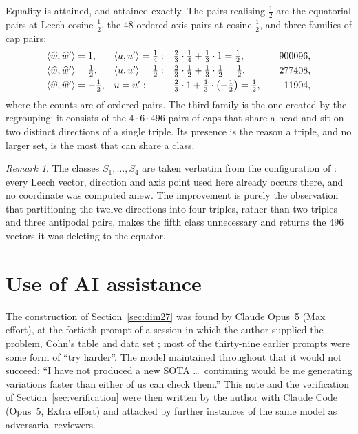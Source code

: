 \documentclass[11pt]{amsart}
\theoremstyle{remark}
\newtheorem{remark}[theorem]{Remark}
\newcommand{\ip}[2]{\langle #1,#2\rangle}
\newcommand{\wh}{\widehat{w}}
\begin{document}
Equality is attained, and attained exactly. The pairs realising $\tfrac12$ are
the equatorial pairs at Leech cosine $\tfrac12$, the $48$ ordered axis pairs at
cosine $\tfrac12$, and three families of cap pairs:
\[
\begin{array}{lll@{\qquad}r}
   \ip{\wh}{\wh{}'}=1,        &\ip{u}{u'}=\tfrac14:
      &\tfrac23\cdot\tfrac14+\tfrac13\cdot1=\tfrac12,
      &900096,\\[3pt]
   \ip{\wh}{\wh{}'}=\tfrac12, &\ip{u}{u'}=\tfrac12:
      &\tfrac23\cdot\tfrac12+\tfrac13\cdot\tfrac12=\tfrac12,
      &277408,\\[3pt]
   \ip{\wh}{\wh{}'}=-\tfrac12,&u=u':
      &\tfrac23\cdot1+\tfrac13\cdot\bigl(-\tfrac12\bigr)=\tfrac12,
      &11904,
\end{array}
\]
where the counts are of ordered pairs. The third family is the one created by
the regrouping: it consists of the $4\cdot6\cdot496$ pairs of caps that share a
head and sit on two distinct directions of a single triple. Its presence is the
reason a triple, and no larger set, is the most that can share a class.

\begin{remark}
The classes $S_1,\dots,S_4$ are taken verbatim from the configuration of
\cite{ma2025}: every Leech vector, direction and axis point used here already
occurs there, and no coordinate was computed anew. The improvement is purely the
observation that partitioning the twelve directions into four triples, rather
than two triples and three antipodal pairs, makes the fifth class unnecessary
and returns the $496$ vectors it was deleting to the equator.
\end{remark}

\section*{Use of AI assistance}

The construction of Section~\ref{sec:dim27} was found by Claude Opus~5 (Max
effort), at the fortieth prompt of a session in which the author supplied the
problem, Cohn's table \cite{cohn-table} and data set \cite{cohn-data}; most of
the thirty-nine earlier prompts were some form of ``try harder''. The model
maintained throughout that it would not succeed: ``I have not produced a new
SOTA \dots\ continuing would be me generating variations faster than either of
us can check them.'' This note and the verification of
Section~\ref{sec:verification} were then written by the author with Claude Code
(Opus~5, Extra effort) and attacked by further instances of the same model as
adversarial reviewers.
\end{document}
